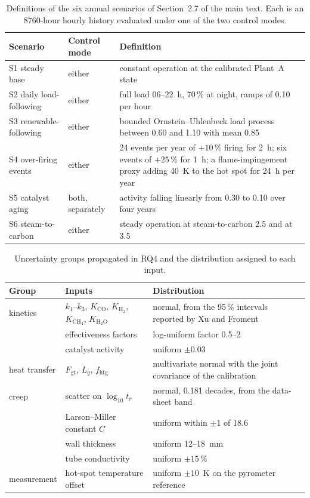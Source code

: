 \documentclass[final,3p,times]{elsarticle}
\begin{document}
\begin{table}[h]
\centering\footnotesize
\caption{Definitions of the six annual scenarios of Section~2.7 of the main text. Each is an 8760-hour hourly history evaluated under one of the two control modes.}
\label{tab:scendef}
\begin{tabular}{ll p{9.2cm}}
\toprule
Scenario & Control mode & Definition \\
\midrule
S1 steady base & either & constant operation at the calibrated Plant~A state \\
S2 daily load-following & either & full load 06--22~h, 70\,\% at night, ramps of 0.10 per hour \\
S3 renewable-following & either & bounded Ornstein--Uhlenbeck load process between 0.60 and 1.10 with mean 0.85 \\
S4 over-firing events & either & 24 events per year of $+10$\,\% firing for 2~h; six events of $+25$\,\% for 1~h; a flame-impingement proxy adding 40~K to the hot spot for 24~h per year \\
S5 catalyst aging & both, separately & activity falling linearly from 0.30 to 0.10 over four years \\
S6 steam-to-carbon & either & steady operation at steam-to-carbon 2.5 and at 3.5 \\
\bottomrule
\end{tabular}
\end{table}

\begin{table}[h]
\centering\footnotesize
\caption{Uncertainty groups propagated in RQ4 and the distribution assigned to each input.}
\label{tab:uqgroups}
\begin{tabular}{ll p{8.6cm}}
\toprule
Group & Inputs & Distribution \\
\midrule
kinetics & $k_1$--$k_3$, $K_{\mathrm{CO}}$, $K_{\mathrm{H_2}}$, $K_{\mathrm{CH_4}}$, $K_{\mathrm{H_2O}}$ & normal, from the 95\,\% intervals reported by Xu and Froment~\cite{xu1989a} \\
 & effectiveness factors & log-uniform factor 0.5--2 \\
 & catalyst activity & uniform $\pm 0.03$ \\
heat transfer & $F_{\mathrm{gt}}$, $L_q$, $f_{\mathrm{htg}}$ & multivariate normal with the joint covariance of the calibration \\
creep & scatter on $\log_{10} t_r$ & normal, 0.181 decades, from the data-sheet band \\
 & Larson--Miller constant $C$ & uniform within $\pm 1$ of 18.6 \\
 & wall thickness & uniform 12--18~mm \\
 & tube conductivity & uniform $\pm 15$\,\% \\
measurement & hot-spot temperature offset & uniform $\pm 10$~K on the pyrometer reference \\
\bottomrule
\end{tabular}
\end{table}
\end{document}
